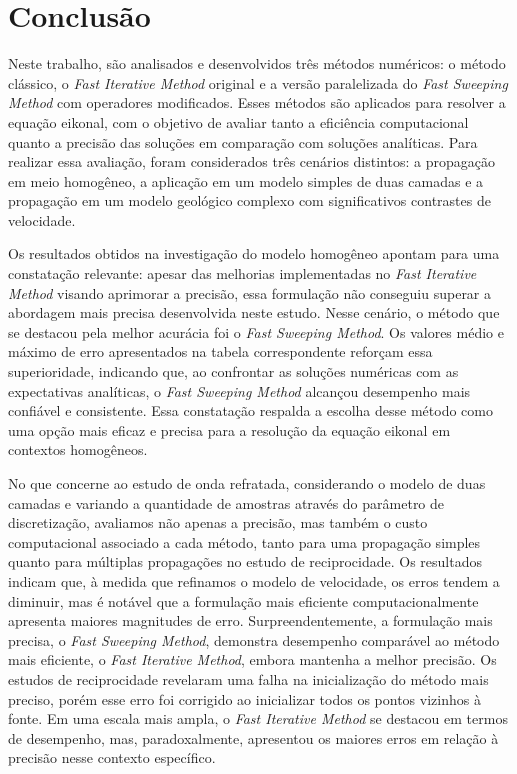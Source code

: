 \chapter{Conclusão}
\label{ch:conclusao}

Neste trabalho, são analisados e desenvolvidos três métodos numéricos: o método clássico, o \textit{Fast Iterative Method} original e a versão paralelizada do \textit{Fast Sweeping Method} com operadores modificados. Esses métodos são aplicados para resolver a equação eikonal, com o objetivo de avaliar tanto a eficiência computacional quanto a precisão das soluções em comparação com soluções analíticas. Para realizar essa avaliação, foram considerados três cenários distintos: a propagação em meio homogêneo, a aplicação em um modelo simples de duas camadas e a propagação em um modelo geológico complexo com significativos contrastes de velocidade.

Os resultados obtidos na investigação do modelo homogêneo apontam para uma constatação relevante: apesar das melhorias implementadas no \textit{Fast Iterative Method} visando aprimorar a precisão, essa formulação não conseguiu superar a abordagem mais precisa desenvolvida neste estudo. Nesse cenário, o método que se destacou pela melhor acurácia foi o \textit{Fast Sweeping Method}. Os valores médio e máximo de erro apresentados na tabela correspondente reforçam essa superioridade, indicando que, ao confrontar as soluções numéricas com as expectativas analíticas, o \textit{Fast Sweeping Method} alcançou desempenho mais confiável e consistente. Essa constatação respalda a escolha desse método como uma opção mais eficaz e precisa para a resolução da equação eikonal em contextos homogêneos.

No que concerne ao estudo de onda refratada, considerando o modelo de duas camadas e variando a quantidade de amostras através do parâmetro de discretização, avaliamos não apenas a precisão, mas também o custo computacional associado a cada método, tanto para uma propagação simples quanto para múltiplas propagações no estudo de reciprocidade. Os resultados indicam que, à medida que refinamos o modelo de velocidade, os erros tendem a diminuir, mas é notável que a formulação mais eficiente computacionalmente apresenta maiores magnitudes de erro. Surpreendentemente, a formulação mais precisa, o \textit{Fast Sweeping Method}, demonstra desempenho comparável ao método mais eficiente, o \textit{Fast Iterative Method}, embora mantenha a melhor precisão. Os estudos de reciprocidade revelaram uma falha na inicialização do método mais preciso, porém esse erro foi corrigido ao inicializar todos os pontos vizinhos à fonte. Em uma escala mais ampla, o \textit{Fast Iterative Method} se destacou em termos de desempenho, mas, paradoxalmente, apresentou os maiores erros em relação à precisão nesse contexto específico.

